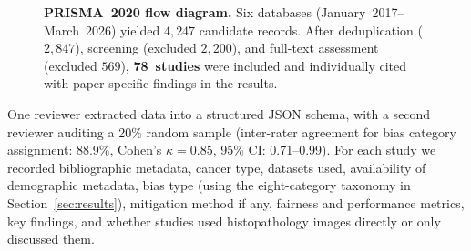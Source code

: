 \begin{figure}[htbp]
  \caption{\textbf{PRISMA~2020 flow diagram.}
           Six databases (January~2017--March~2026) yielded $4{,}247$
           candidate records. After deduplication ($2{,}847$), screening
           (excluded $2{,}200$), and full-text assessment (excluded
           $569$), \textbf{78~studies} were included and individually
           cited with paper-specific findings in the results.}
  \label{fig:prisma}
\end{figure}

\label{sec:methods:extraction}
One reviewer extracted data into a structured JSON schema,
with a second reviewer auditing a 20\% random sample (inter-rater agreement for bias category assignment: 88.9\%, Cohen's $\kappa=0.85$, 95\% CI: 0.71--0.99). For each study we
recorded bibliographic metadata, cancer type, datasets used,
availability of demographic metadata, bias type (using the
eight-category taxonomy in Section~\ref{sec:results}), mitigation
method if any, fairness and performance metrics, key findings, and
whether studies used histopathology images directly or only discussed them.

